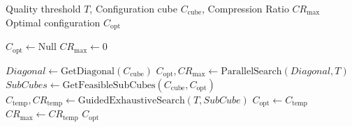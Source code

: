 \begin{algorithm}[t]
\small
\caption{Guided Exhaustive Search}
\begin{algorithmic}[1]
\REQUIRE Quality threshold $T$, Configuration cube $C_{\text{cube}}$, Compression Ratio $CR_{\text{max}}$
\ENSURE Optimal configuration $C_{\text{opt}}$

\STATE $C_{\text{opt}} \gets \text{Null}$
\STATE $CR_{\text{max}} \gets 0$

\STATE $Diagonal \gets \text{GetDiagonal}(C_{\text{cube}})$
\STATE $C_{\text{opt}}, CR_{\text{max}} \gets \text{ParallelSearch}(Diagonal, T)$
\STATE $SubCubes \gets \text{GetFeasibleSubCubes}(C_{\text{cube}}, C_{\text{opt}})$
\STATE $C_{\text{temp}}, CR_{\text{temp}} \gets \text{GuidedExhaustiveSearch}(T, SubCube)$
\STATE $C_{\text{opt}} \gets C_{\text{temp}}$
\STATE $CR_{\text{max}} \gets CR_{\text{temp}}$
\ENDIF
\ENDFOR
\RETURN $C_{\text{opt}}$
\end{algorithmic}\label{algo:guided-search}
\end{algorithm}
